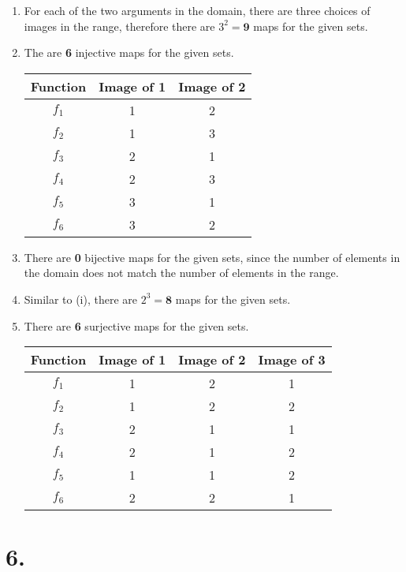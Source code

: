 \documentclass[12pt]{article}
\newcommand{\p}[1]{\item[\textnormal{(#1)}]}
\newenvironment{ps}
{\begin{enumerate}[leftmargin=0em, itemindent=1.5em]}
{\end{enumerate}}
\begin{document}
\begin{ps}

    \p{i} For each of the two arguments in the domain, there are three choices of images in the
    range, therefore there are \( 3^2 = \mathbf{9} \) maps for the given sets.

    \p{ii} The are \textbf{6} injective maps for the given sets.
        \begin{center}
        \begin{tabular}{|c|c|c|}
        \hline
        Function & Image of 1 & Image of 2 \\
        \hline
        $f_1$ & 1 & 2 \\
        $f_2$ & 1 & 3 \\
        $f_3$ & 2 & 1 \\
        $f_4$ & 2 & 3 \\
        $f_5$ & 3 & 1 \\
        $f_6$ & 3 & 2 \\
        \hline
        \end{tabular}
        \end{center}

    \p{iii} There are \textbf{0} bijective maps for the given sets, since the number of elements in
    the domain does not match the number of elements in the range.

    \p{iv} Similar to (i), there are \( 2^3 = \textbf{8} \) maps for the given sets. 

    \p{v} There are \textbf{6} surjective maps for the given sets.

        \begin{center}
        \begin{tabular}{|c|c|c|c|}
        \hline
        Function & Image of 1 & Image of 2 & Image of 3 \\
        \hline
        $f_1$ & 1 & 2 & 1 \\
        $f_2$ & 1 & 2 & 2 \\
        $f_3$ & 2 & 1 & 1 \\
        $f_4$ & 2 & 1 & 2 \\
        $f_5$ & 1 & 1 & 2 \\
        $f_6$ & 2 & 2 & 1 \\
        \hline
        \end{tabular}
        \end{center}

\end{ps}


\section*{6.}
\end{document}
